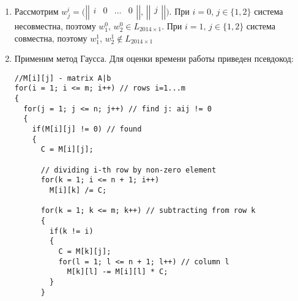 \documentclass[a4paper]{article}
\newcommand{\matrixl}{\left|\left|}
\newcommand{\matrixr}{\right|\right|}
\begin{document}
\begin{enumerate}
\item Рассмотрим $w^i_j=\big(\matrixl\begin{array}{cccc}
i & 0 & ... & 0\\
\end{array}\matrixr,\,\matrixl
\begin{array}{c}
j\\
\end{array}\matrixr\big)$. При $i=0,\,j\in\{1,2\}$ система несовместна, поэтому $w^0_1,\,w^0_2\in L_{2014\times 1}$. При $i=1,\,j\in\{1,2\}$ система совместна, поэтому $w^1_1,\,w^1_2\notin L_{2014\times 1}$
\item Применим метод Гаусса. Для оценки времени работы приведен псевдокод:\newline


%
%

\begin{lstlisting}
//M[i][j] - matrix A|b
for(i = 1; i <= m; i++) // rows i=1...m
{
  for(j = 1; j <= n; j++) // find j: aij != 0
  {
    if(M[i][j] != 0) // found
    {
      C = M[i][j];

      // dividing i-th row by non-zero element
      for(k = 1; i <= n + 1; i++)
        M[i][k] /= C;

      for(k = 1; k <= m; k++) // subtracting from row k
      {
        if(k != i)
        {
          C = M[k][j];
          for(l = 1; l <= n + 1; l++) // column l
            M[k][l] -= M[i][l] * C;
        }
      }
      

\end{lstlisting}
\end{enumerate}
\end{document}
